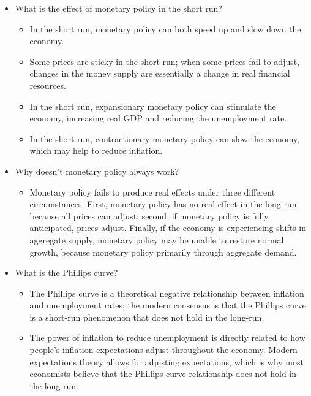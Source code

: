 \documentclass[11pt]{article} %
\begin{document}
\begin{tcolorbox}[width=\textwidth,colback={white},title={Big Questions},colbacktitle=yellow,coltitle=blue]
\begin{itemize}
\item What is the effect of monetary policy in the short run?
\begin{itemize}
\item In the short run, monetary policy can both speed up and slow down the economy.
\item Some prices are sticky in the short run; when some prices fail to adjust, changes in the money supply are essentially a change in real financial resources.
\item In the short run, expansionary monetary policy can stimulate the economy, increasing real GDP and reducing the unemployment rate.
\item In the short run, contractionary monetary policy can slow the economy, which may help to reduce inflation.
\end{itemize}
\item Why doesn't monetary policy always work?
\begin{itemize}
\item Monetary policy fails to produce real effects under three different circumstances. First, monetary policy has no real effect in the long run because all prices can adjust; second, if monetary policy is fully anticipated, prices adjust. Finally, if the economy is experiencing shifts in aggregate supply, monetary policy may be unable to restore normal growth, because monetary policy primarily through aggregate demand.
\end{itemize}
\item What is the Phillips curve?
\begin{itemize}
\item The Phillips curve is a theoretical negative relationship between inflation and unemployment rates; the modern consensus is that the Phillips curve is a short-run phenomenon that does not hold in the long-run.
\item The power of inflation to reduce unemployment is directly related to how people's inflation expectations adjust throughout the economy. Modern expectations theory allows for adjusting expectations, which is why most economists believe that the Phillips curve relationship does not hold in the long run.
\end{itemize}
\end{itemize}
\end{tcolorbox}
\end{document}
